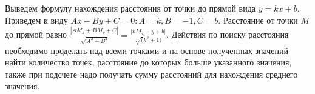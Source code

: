 \solutionSection

Выведем формулу нахождения расстояния от точки до прямой вида $y = kx + b$. Приведем к виду $Ax + By + C = 0: A = k, B = -1, C = b$.
Расстояние от точки $M$ до прямой равно $\frac{|AM_x + BM_y + C|}{\sqrt{A^2 + B^2}} = \frac{|kM_x-y+b|}{\sqrt(k^2 + 1)}$. Действия по поиску расстояния необходимо проделать над всеми точками и на основе полученных значений найти количество точек, расстояние до которых больше указанного значения, также при подсчете надо получать сумму расстояний для нахождения среднего значения. 

